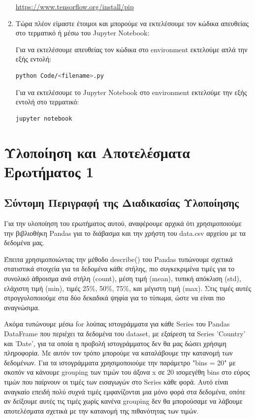 \documentclass[12pt,a4paper]{article}
\begin{document}
\begin{enumerate}
        \textcolor{blue}{\href{https://www.tensorflow.org/install/pip}{https://www.tensorflow.org/install/pip}}

    \item Τώρα πλέον είμαστε έτοιμοι και μπορούμε να εκτελέσουμε τον κώδικα απευθείας στο τερματικό ή μέσω του Jupyter Notebook:

        Για να εκτελέσουμε απευθείας τον κώδικα στο environment εκτελούμε απλά την εξής εντολή:
         \begin{lstlisting}[language=Bash]
python Code/<filename>.py\end{lstlisting}

        Για να εκτελέσουμε το Jupyter Notebook στο environment εκτελούμε την εξής εντολή στο τερματικό:
         \begin{lstlisting}[language=Bash]
jupyter notebook\end{lstlisting}
\end{enumerate}

\section{Υλοποίηση και Αποτελέσματα Ερωτήματος 1}

\subsection{Σύντομη Περιγραφή της Διαδικασίας Υλοποίησης}

Για την υλοποίηση του ερωτήματος αυτού, αναφέρουμε αρχικά ότι χρησιμοποιούμε την βιβλιοθήκη Pandas για το διάβασμα και την χρήστη του data.csv αρχείου με τα δεδομένα μας.

Έπειτα χρησιμοποιώντας την μέθοδο describe() του Pandas τυπώνουμε σχετικά στατιστικά στοιχεία για τα δεδομένα κάθε στήλης, πιο συγκεκριμένα τιμές για το συνολικό άθροισμα ανά στήλη (count), μέση τιμή (mean), τυπική απόκλιση (std), ελάχιστη τιμή (min), τιμές 25\%, 50\%, 75\%, και μέγιστη τιμή (max). Στις τιμές αυτές στρογγυλοποιούμε στα δύο δεκαδικά ψηφία για το τύπωμα, ώστε να είναι πιο αναγνώσιμα. 

Ακόμα τυπώνουμε μέσω for λούπας ιστογράμματα για κάθε Series του Pandas DataFrame που περιέχει τα δεδομένα του dataset, με εξαίρεση τα Series 'Country' και 'Date', για τα οποία η προβολή ιστογράμματος δεν θα μας δώσει χρήσιμη πληροφορία. Με αυτόν τον τρόπο μπορούμε να καταλάβουμε την κατανομή των δεδομένων. Για τα ιστογράμματα χρησιμοποιούμε την παράμετρο "bins = 20" με σκοπόν να κάνουμε grouping των τιμών του άξονα x σε 20 ισομεγέθη bins στο εύρος τιμών που παίρνουν οι τιμές των εισαγωγών στο Series κάθε φορά. Αυτό είναι αναγκαίο επειδή πολύ συχνά τιμές εμφανίζονται μια μόνο φορά στα δεδομένα, οπότε αν δείξουμε αυτές τις τιμές χωρίς κανένα grouping δεν θα μπορούσαμε να λάβουμε αποτελέσματα σχετικά με την κατανομή της πιθανότητας των τιμών.
\end{document}
